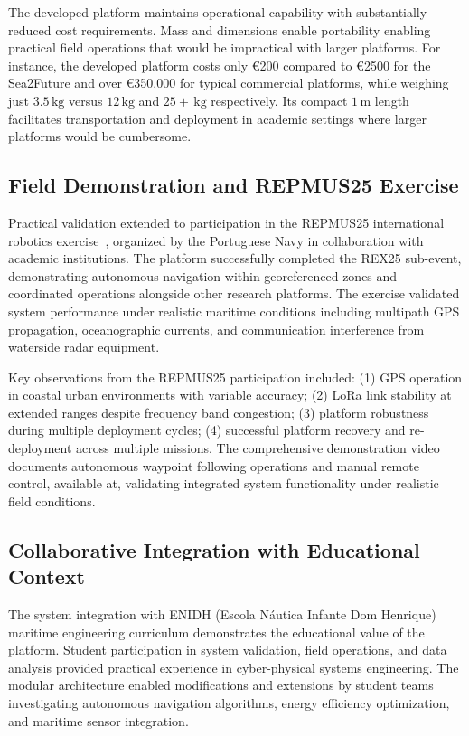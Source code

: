 \documentclass[conference]{IEEEtran}
\begin{document}
The developed platform maintains operational capability with substantially reduced cost requirements. Mass and dimensions enable portability enabling practical field operations that would be impractical with larger platforms. For instance, the developed platform costs only €200 compared to €2500 for the Sea2Future and over €350,000 for typical commercial platforms, while weighing just $3.5 \, \mathrm{kg}$ versus $12 \, \mathrm{kg}$ and $25+ \, \mathrm{kg}$ respectively. Its compact $1 \, \mathrm{m}$ length facilitates transportation and deployment in academic settings where larger platforms would be cumbersome.

\subsection{Field Demonstration and REPMUS25 Exercise}
Practical validation extended to participation in the REPMUS25 international robotics exercise~\cite{escolanaval-repmus,iddportugal-repmus,sapo-repmus}, organized by the Portuguese Navy in collaboration with academic institutions. The platform successfully completed the REX25 sub-event, demonstrating autonomous navigation within georeferenced zones and coordinated operations alongside other research platforms. The exercise validated system performance under realistic maritime conditions including multipath GPS propagation, oceanographic currents, and communication interference from waterside radar equipment.

Key observations from the REPMUS25 participation included: (1) GPS operation in coastal urban environments with variable accuracy; (2) LoRa link stability at extended ranges despite frequency band congestion; (3) platform robustness during multiple deployment cycles; (4) successful platform recovery and re-deployment across multiple missions. The comprehensive demonstration video \cite{usv-video} documents autonomous waypoint following operations and manual remote control, available at, validating integrated system functionality under realistic field conditions.

\subsection{Collaborative Integration with Educational Context}
The system integration with ENIDH (Escola Náutica Infante Dom Henrique) maritime engineering curriculum demonstrates the educational value of the platform. Student participation in system validation, field operations, and data analysis provided practical experience in cyber-physical systems engineering. The modular architecture enabled modifications and extensions by student teams investigating autonomous navigation algorithms, energy efficiency optimization, and maritime sensor integration.
\end{document}
